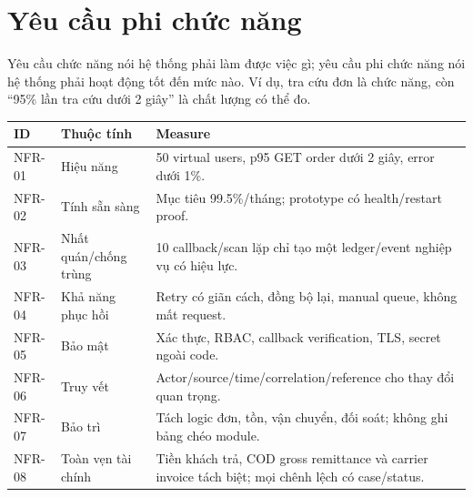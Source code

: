 \documentclass[12pt,a4paper]{report}
\begin{document}
\section{Yêu cầu phi chức năng}
Yêu cầu chức năng nói hệ thống phải làm được việc gì; yêu cầu phi chức năng nói hệ thống phải hoạt động tốt đến mức nào. Ví dụ, tra cứu đơn là chức năng, còn ``95\% lần tra cứu dưới 2 giây'' là chất lượng có thể đo.
\begin{longtable}{p{}p{}p{}}
\toprule
\textbf{ID} & \textbf{Thuộc tính} & \textbf{Measure}\\
\midrule\endhead
NFR-01 & Hiệu năng & 50 virtual users, p95 GET order dưới 2 giây, error dưới 1\%.\\
NFR-02 & Tính sẵn sàng & Mục tiêu 99.5\%/tháng; prototype có health/restart proof.\\
NFR-03 & Nhất quán/chống trùng & 10 callback/scan lặp chỉ tạo một ledger/event nghiệp vụ có hiệu lực.\\
NFR-04 & Khả năng phục hồi & Retry có giãn cách, đồng bộ lại, manual queue, không mất request.\\
NFR-05 & Bảo mật & Xác thực, RBAC, callback verification, TLS, secret ngoài code.\\
NFR-06 & Truy vết & Actor/source/time/correlation/reference cho thay đổi quan trọng.\\
NFR-07 & Bảo trì & Tách logic đơn, tồn, vận chuyển, đối soát; không ghi bảng chéo module.\\
NFR-08 & Toàn vẹn tài chính & Tiền khách trả, COD gross remittance và carrier invoice tách biệt; mọi chênh lệch có case/status.\\
\bottomrule
\end{longtable}
\end{document}
